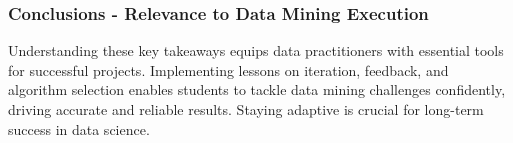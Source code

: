 \documentclass[aspectratio=169]{beamer}
\begin{document}
\begin{frame}[fragile]
    \frametitle{Conclusions - Relevance to Data Mining Execution}
    Understanding these key takeaways equips data practitioners with essential tools for successful projects. 
    Implementing lessons on iteration, feedback, and algorithm selection enables students to tackle data mining challenges confidently, driving accurate and reliable results. 
    Staying adaptive is crucial for long-term success in data science.
\end{frame}
\end{document}
